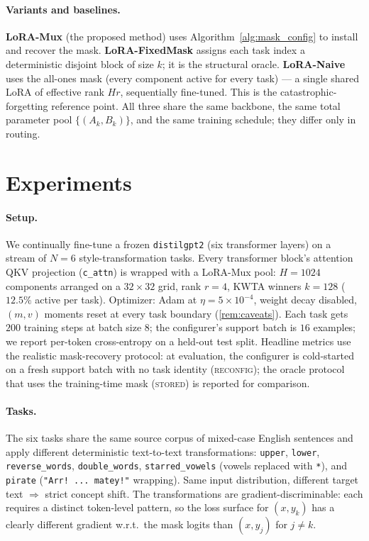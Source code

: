 \documentclass{article}
\theoremstyle{plain}
\theoremstyle{remark}
\begin{document}
\paragraph{Variants and baselines.}
\textbf{LoRA-Mux} (the proposed method) uses Algorithm~\ref{alg:mask_config} to install and recover the mask.
\textbf{LoRA-FixedMask} assigns each task index a deterministic disjoint block of size $k$; it is the structural oracle.
\textbf{LoRA-Naive} uses the all-ones mask (every component active for every task) — a single shared LoRA of effective rank $H r$, sequentially fine-tuned.  This is the catastrophic-forgetting reference point. All three share the same backbone, the same total parameter pool $\{(A_k,B_k)\}$, and the same training schedule; they differ only in routing.

\section{Experiments}
\label{sec:experiments}

\paragraph{Setup.}
\label{sec:setup}
We continually fine-tune a frozen \texttt{distilgpt2} (six transformer layers) on a stream of $N=6$ style-transformation tasks. Every transformer block's attention QKV projection (\texttt{c\_attn}) is wrapped with a LoRA-Mux pool: $H=1024$ components arranged on a $32\times 32$ grid, rank $r=4$, KWTA winners $k=128$ ($12.5\%$ active per task). Optimizer: Adam at $\eta = 5\times 10^{-4}$, weight decay disabled, $(m,v)$ moments reset at every task boundary (\cref{rem:caveats}). Each task gets $200$ training steps at batch size $8$; the configurer's support batch is $16$ examples; we report per-token cross-entropy on a held-out test split. Headline metrics use the realistic mask-recovery protocol: at evaluation, the configurer is cold-started on a fresh support batch with no task identity (\textsc{reconfig}); the oracle protocol that uses the training-time mask (\textsc{stored}) is reported for comparison.

\paragraph{Tasks.}
The six tasks share the same source corpus of mixed-case English sentences and apply different deterministic text-to-text transformations: \texttt{upper}, \texttt{lower}, \texttt{reverse\_words}, \texttt{double\_words}, \texttt{starred\_vowels} (vowels replaced with \texttt{*}), and \texttt{pirate} (\texttt{"Arr! ... matey!"} wrapping). Same input distribution, different target text $\Rightarrow$ strict concept shift. The transformations are gradient-discriminable: each requires a distinct token-level pattern, so the loss surface for $(x, y_k)$ has a clearly different gradient w.r.t.\ the mask logits than $(x, y_j)$ for $j\ne k$.
\end{document}
